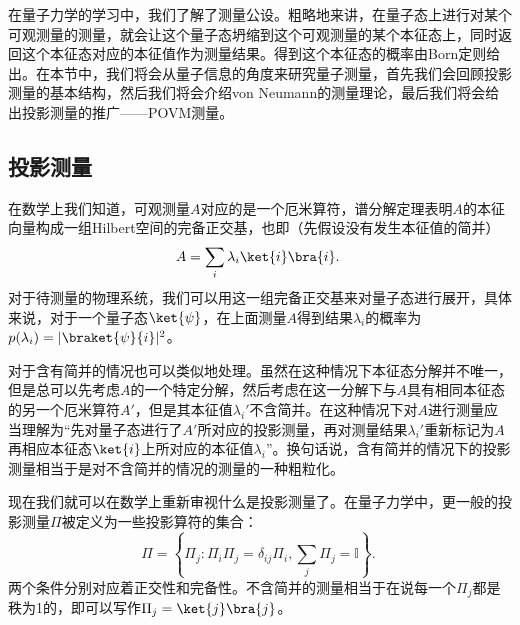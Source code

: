 

在量子力学的学习中，我们了解了测量公设。粗略地来讲，在量子态上进行对某个可观测量的测量，就会让这个量子态坍缩到这个可观测量的某个本征态上，同时返回这个本征态对应的本征值作为测量结果。得到这个本征态的概率由Born定则给出。在本节中，我们将会从量子信息的角度来研究量子测量，首先我们会回顾投影测量的基本结构，然后我们将会介绍von Neumann的测量理论，最后我们将会给出投影测量的推广——POVM测量。

\subsection{投影测量}

在数学上我们知道，可观测量$A$对应的是一个厄米算符，谱分解定理表明$A$的本征向量构成一组Hilbert空间的完备正交基，也即（先假设没有发生本征值的简并）
\begin{equation}
A=\sum_i\lambda_i\ket{i}\bra{i}.~
\end{equation}
对于待测量的物理系统，我们可以用这一组完备正交基来对量子态进行展开，具体来说，对于一个量子态$\ket{\psi}$，在上面测量$A$得到结果$\lambda_i$的概率为$p(\lambda_i)=|\braket{\psi}{i}|^2$。

对于含有简并的情况也可以类似地处理。虽然在这种情况下本征态分解并不唯一，但是总可以先考虑$A$的一个特定分解，然后考虑在这一分解下与$A$具有相同本征态的另一个厄米算符$A'$，但是其本征值$\lambda_i'$不含简并。在这种情况下对$A$进行测量应当理解为“先对量子态进行了$A'$所对应的投影测量，再对测量结果$\lambda_i'$重新标记为$A$再相应本征态$\ket{i}$上所对应的本征值$\lambda_i$”。换句话说，含有简并的情况下的投影测量相当于是对不含简并的情况的测量的一种粗粒化。

现在我们就可以在数学上重新审视什么是投影测量了。在量子力学中，更一般的投影测量$\Pi$被定义为一些投影算符的集合：
$$
\Pi=\left\{\Pi_j: \Pi_i \Pi_j=\delta_{i j} \Pi_i, \sum_j \Pi_j=\mathbb{I}\right\}.~
$$
两个条件分别对应着正交性和完备性。不含简并的测量相当于在说每一个$\Pi_j$都是秩为1的，即可以写作$\Pi_j=\ket{j}\bra{j}$。

